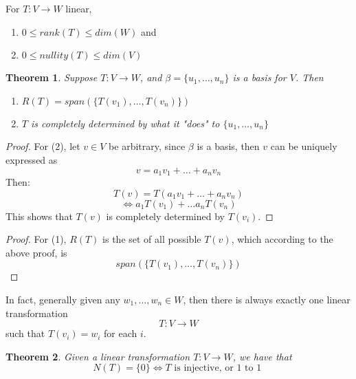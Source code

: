\documentclass{article}
\newtheorem{theorem}{Theorem}[section]
\newtheorem{one minute paper}[theorem]{One Minute Paper}
\begin{document}
For $T : V \rightarrow W$ linear, 
\begin{enumerate}
    \item $0 \leq rank(T) \leq dim(W)$ and 
    \item $0 \leq nullity(T) \leq dim(V)$
\end{enumerate}

\begin{theorem}
    Suppose $T : V \rightarrow W$, and $\beta = \{u_1, \dots, u_n\}$ is a basis for $V$. Then 
    \begin{enumerate}
        \item $R(T) = span(\{T(v_1), \dots, T(v_n)\})$
        \item $T$ is completely determined by what it "does" to $\{u_1, \dots, u_n\}$
    \end{enumerate}
\end{theorem}

\begin{proof}
    For (2), let $v \in V$ be arbitrary, since $\beta$ is a basis, then $v$ can be uniquely expressed as 
    \begin{equation}
        v = a_1v_1 + \dots + a_nv_n
    \end{equation}
    Then:
    \begin{equation}
        T(v) = T(a_1v_1 + \dots + a_nv_n)
    \end{equation}
    \begin{equation}
        \iff a_1T(v_1) + \dots a_nT(v_n)
    \end{equation}
    This shows that $T(v)$ is completely determined by $T(v_i)$.
\end{proof}

\begin{proof}
    For (1), $R(T)$ is the set of all possible $T(v)$, which according to the above proof, is 
    \begin{equation}
        span(\{T(v_1), \dots, T(v_n)\})
    \end{equation}
\end{proof}

In fact, generally given any $w_1, \dots, w_n \in W$, then there is always exactly one linear transformation
\begin{equation}
    T: V \rightarrow W
\end{equation}
such that $T(v_i) = w_i$ for each $i$. 

\begin{theorem}
    Given a linear transformation $T: V \rightarrow W$, we have that 
    \begin{equation}
        N(T) = \{0\} \iff T \text{ is injective, or 1 to 1 }
    \end{equation}
\end{theorem}
\end{document}
